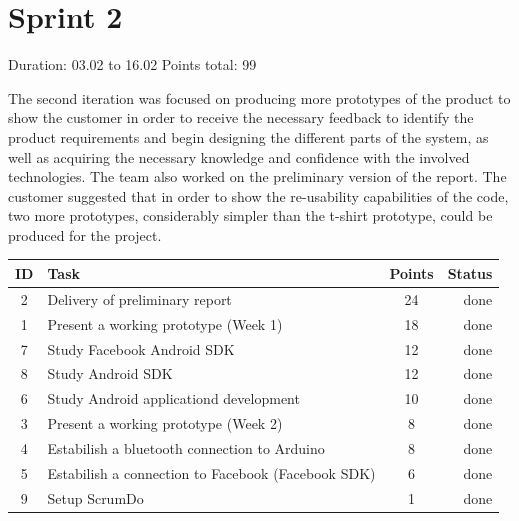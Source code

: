 \newpage


\section{Sprint 2}

Duration: 03.02 to 16.02
Points total: 99

The second iteration was focused on producing more prototypes of the product to
show the customer in order to receive the necessary feedback to identify
the product requirements and begin designing the different parts of the system,
as well as acquiring the necessary knowledge and confidence with the involved
technologies. The team also worked on the preliminary version of the report.
The customer suggested that in order to show the re-usability capabilities of
the code, two more prototypes, considerably simpler than the t-shirt prototype,
could be produced for the project.

\begin{table}[ht!]
\begin{tabular}{ | c | l | c | r | }

\hline
\textbf{ID} & \textbf{Task} & \textbf{Points} & \textbf{Status} \\
\hline

 2 & Delivery of preliminary report					& 24 & done \\
\hline
 1 & Present a working prototype (Week 1)			& 18 & done \\
\hline
 7 & Study Facebook Android SDK						& 12 & done \\
\hline
 8 & Study Android SDK								& 12 & done \\
\hline
 6 & Study Android applicationd development			& 10 & done \\
\hline
 3 & Present a working prototype (Week 2)			& 8  & done \\
\hline
 4 & Estabilish a bluetooth connection to Arduino	& 8  & done \\
\hline
 5 & Estabilish a connection to Facebook
(Facebook SDK)										& 6  & done \\
\hline
 9 & Setup ScrumDo									& 1  & done \\
\hline

\end{tabular}
\end{table}

